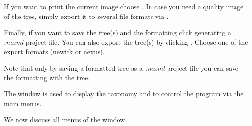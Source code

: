 \documentclass[11pt]{article}
\begin{document}
If you want to print the current image
choose . In case you need a quality image of the tree, simply export it to several 
file formats via .

Finally, if you want to save the tree(s) and the formatting click  generating a \textit{.nexml} project file.
You can also export the tree(s) by clicking . Choose one of the export formats (newick or nexus).

Note that only by saving a formatted tree as a \textit{.nexml} project file
you can save the formatting with the tree.

The  window is used to display the taxonomy and to
control the program via the main menus.

We now discuss all menus of the  window. 
\end{document}

